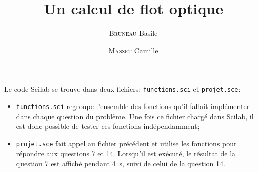 \documentclass[12pt]{scrartcl}
\title{Un calcul de flot optique}
\author{\textsc{Bruneau} Basile \and \textsc{Masset} Camille}
\date{\displaydate{date}}
\begin{document}
\setlength{\parskip}{1em}

\maketitle

Le code Scilab se trouve dans deux fichiers: \verb|functions.sci| et \verb|projet.sce|:
\begin{itemize}
\item \verb|functions.sci| regroupe l'ensemble des fonctions qu'il fallait implémenter dans chaque question du problème. Une fois ce fichier chargé dans Scilab, il est donc possible de tester ces fonctions indépendamment;
\item \verb|projet.sce| fait appel au fichier précédent et utilise les fonctions pour répondre aux questions 7 et 14. Lorsqu'il est exécuté, le résultat de la question 7 est affiché pendant \SI{4}{\second}, suivi de celui de la question 14.
\end{itemize}


\pagebreak


\pagebreak


\end{document}
